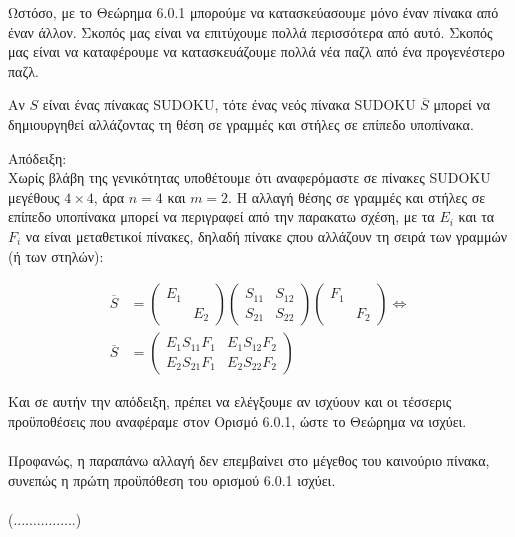 \documentclass[12pt]{book}
\theoremstyle{definition}
\begin{document}
Ωστόσο, με το Θεώρημα 6.0.1 μπορούμε να κατασκεύασουμε μόνο έναν πίνακα από έναν άλλον. Σκοπός μας είναι να επιτύχουμε πολλά περισσότερα από αυτό. Σκοπός μας είναι να καταφέρουμε να κατασκευάζουμε πολλά νέα παζλ από ένα προγενέστερο παζλ.

\begin{theorem}{}{}
	Αν \(S\) είναι ένας πίνακας SUDOKU, τότε ένας νεός πίνακα SUDOKU \(\overline{S}\) μπορεί να δημιουργηθεί αλλάζοντας τη θέση σε γραμμές και στήλες σε επίπεδο υποπίνακα.
\end{theorem}

Απόδειξη: \\
Χωρίς βλάβη της γενικότητας υποθέτουμε ότι αναφερόμαστε σε πίνακες SUDOKU μεγέθους \(4 \times 4\), άρα \(n = 4\) και \(m = 2\). Η αλλαγή θέσης σε γραμμές και στήλες σε επίπεδο υποπίνακα μπορεί να περιγραφεί από την παρακατω σχέση, με τα \(E_{i}\) και τα \(F_{i}\) να είναι μεταθετικοί πίνακες, δηλαδή πίνακε ςπου αλλάζουν τη σειρά των γραμμών (ή των στηλών):

\begin{align*}
	\overline{S} &= \begin{pmatrix}
						E_{1} &  \\
							  & E_{2}
	\end{pmatrix}
	\begin{pmatrix}
		S_{11} & S_{12} \\
		S_{21} & S_{22}
	\end{pmatrix}
	\begin{pmatrix}
		F_{1} &  \\
		& F_{2}
	\end{pmatrix} \Leftrightarrow \\
	\overline{S} &= \begin{pmatrix}
						E_{1}S_{11}F_{1} & E_{1}S_{12}F_{2} \\
						E_{2}S_{21}F_{1} & E_{2}S_{22}F_{2}
					\end{pmatrix}
\end{align*}

Και σε αυτήν την απόδειξη, πρέπει να ελέγξουμε αν ισχύουν και οι τέσσερις προϋποθέσεις που αναφέραμε στον Ορισμό 6.0.1, ώστε το Θεώρημα να ισχύει. \\ \\

Προφανώς, η παραπάνω αλλαγή δεν επεμβαίνει στο μέγεθος του καινούριο πίνακα, συνεπώς η πρώτη προϋπόθεση του ορισμού 6.0.1 ισχύει. \\ \\ (................)
\end{document}
